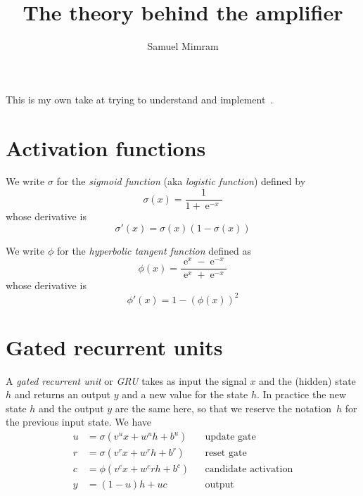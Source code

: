 \documentclass[a4paper]{article}
\title{The theory behind the amplifier}
\author{Samuel Mimram}
\newcommand{\ce}{\operatorname{e}}
\begin{document}
\maketitle

This is my own take at trying to understand and implement~\cite{wright2019real}.

\section{Activation functions}
We write $\sigma$ for the \emph{sigmoid function} (aka \emph{logistic function})
defined by
\[
  \sigma(x) = \frac 1 {1 + \ce^{-x}}
\]
whose derivative is
\[
  \sigma'(x) = \sigma(x)(1-\sigma(x))
\]

We write $\phi$ for the \emph{hyperbolic tangent function} defined as
\[
  \phi(x)=\frac{\ce^{x}-\ce^{-x}}{\ce^{x}+\ce^{-x}}
\]
whose derivative is
\[
  \phi'(x)=1-(\phi(x))^2
\]

\section{Gated recurrent units}
A \emph{gated recurrent unit} or \emph{GRU} takes as input the signal $x$ and
the (hidden) state $h$ and returns an output $y$ and a new value for the state
$h$. In practice the new state $h$ and the output $y$ are the same here, so that
we reserve the notation~$h$ for the previous input state. We have
\begin{align*}
  u&=\sigma(v^ux+w^uh+b^u)&&\text{update gate}\\
  r&=\sigma(v^rx+w^rh+b^r)&&\text{reset gate}\\
  c&=\phi(v^cx+w^crh+b^c)&&\text{candidate activation}\\
  y&=(1-u)h+uc&&\text{output}
\end{align*}
\end{document}
